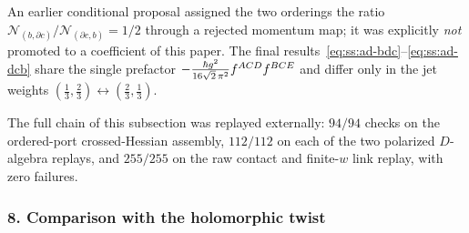 \begin{remark}\label{rem:ss:ad-ratio}
An earlier conditional proposal assigned the two orderings the ratio
$\mathcal N_{(b,\partial c)}/\mathcal N_{(\partial c,b)}=1/2$ through a
rejected momentum map; it was explicitly \emph{not} promoted to a coefficient
of this paper. The final results~\eqref{eq:ss:ad-bdc}--\eqref{eq:ss:ad-dcb}
share the single prefactor
$-\frac{\hbar g^{2}}{16\sqrt2\,\pi^{2}}f^{ACD}f^{BCE}$ and differ only in the
jet weights $(\tfrac13,\tfrac23)\leftrightarrow(\tfrac23,\tfrac13)$.
\end{remark}

\begin{remark}\label{rem:ss:ad-checks}
The full chain of this subsection was replayed externally: $94/94$ checks on
the ordered-port crossed-Hessian assembly, $112/112$ on each of the two
polarized $D$-algebra replays, and $255/255$ on the raw contact and finite-$w$
link replay, with zero failures.
\end{remark}

\subsubsection*{8. Comparison with the holomorphic twist}

